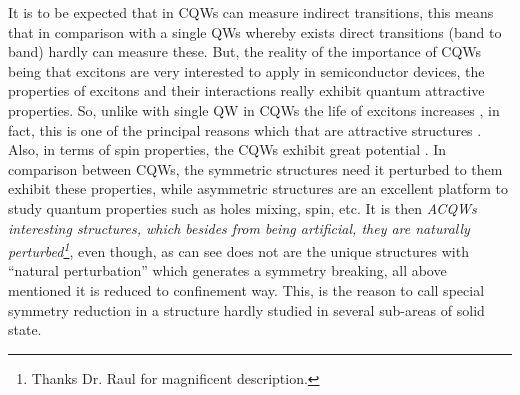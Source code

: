 It is to be expected that in \gls{CQWs} can measure indirect transitions, this means that in comparison with a single QWs whereby exists direct transitions (band to band) hardly can measure these. But, the reality of the importance of \gls{CQWs} being that excitons are very interested to apply in semiconductor devices, the properties of excitons and their interactions really exhibit quantum attractive properties. So, unlike with single \gls{QW} in \gls{CQWs} the life of excitons increases \cite{hammack2009kinetics,golub1990longlived}, in fact, this is one of the principal reasons which that are attractive structures \cite{butov1994condensation,sivalertporn2012direct,winbow2011electrostatic}. Also, in terms of spin properties, the \gls{CQWs} exhibit great potential \cite{bravo2022photoluminiscence}. In comparison between CQWs, the symmetric structures need it perturbed to them exhibit these properties, while asymmetric structures are an excellent platform to study quantum properties such as holes mixing, spin, etc. It is then \emph{\gls{ACQWs} interesting structures, which besides from being artificial, they are naturally perturbed\footnote{Thanks Dr. Raul for magnificent description.}}, even though, as can see does not are the unique structures with ``natural perturbation'' which generates a symmetry breaking, all above mentioned it is reduced to confinement way. This, is the reason to call special symmetry reduction in a structure hardly studied in several sub-areas of solid state.

